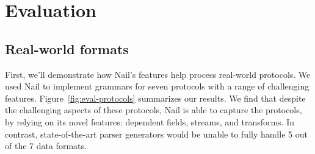 \section{Evaluation}
\label{s:eval}








\subsection{Real-world formats}
\label{s:eval-formats}

First, we'll demonstrate how Nail's features help process real-world protocols. We used Nail to implement grammars
for seven protocols with a range of challenging features.
Figure~\ref{fig:eval-protocols} summarizes our results.
We find that despite the challenging aspects of these protocols, Nail is
able to capture the protocols, by relying on its novel features: dependent
fields, streams, and transforms.  In contrast, state-of-the-art parser
generators would be unable to fully handle 5 out of the 7 data formats.

